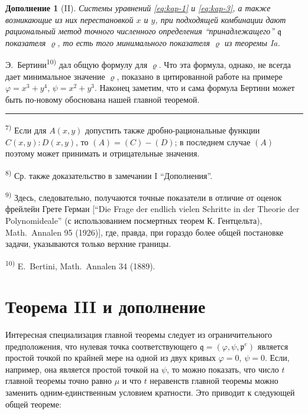 \documentclass[11pt]{article}
\newcommand{\foreign}[1]{#1}
\theoremstyle{plain}
\newtheorem{zusatz}{Дополнение}
\begin{document}
\begin{zusatz}[II]
Системы уравнений \eqref{eq:kap-1} и \eqref{eq:kap-3}, а также
возникающие из них перестановкой $x$ и $y$, при подходящей
комбинации дают рациональный метод точного численного определения
``принадлежащего'' $\mathfrak{q}$ показателя $\varrho$, то есть того
минимального показателя $\varrho$ из теоремы Ia.
\end{zusatz}

Э.\ Бертини\textsuperscript{10)} дал общую формулу для $\varrho$.
Что эта формула, однако, не всегда дает минимальное значение
$\varrho$, показано в цитированной работе на примере
$\varphi = x^{3} + y^{4}$, $\psi = x^{2} + y^{3}$. Наконец заметим,
что и сама формула Бертини может быть по-новому обоснована нашей
главной теоремой.

\vspace{0.5em}
\noindent\rule{\textwidth}{0.4pt}
\vspace{0.3em}

{\footnotesize
\textsuperscript{7)} Если для $A(x,y)$ допустить также дробно-рациональные
функции $C(x,y):D(x,y)$, то $(A) = (C) - (D)$; в последнем случае
$(A)$ поэтому может принимать и отрицательные значения.

\textsuperscript{8)} Ср. также доказательство в замечании I ``Дополнения''.

\textsuperscript{9)} Здесь, следовательно, получаются точные показатели в
отличие от оценок фрейлейн Грете Герман [``Die Frage der endlich vielen Schritte
in der Theorie der Polynomideale'' (с использованием посмертных теорем
К. Гентцельта), \foreign{Math.\ Annalen} 95 (1926)], где, правда, при
гораздо более общей постановке задачи, указываются только верхние границы.

\textsuperscript{10)} E.\ Bertini, \foreign{Math.\ Annalen} 34 (1889).
}

\newpage
\section*{Теорема III и дополнение}

Интересная специализация главной теоремы следует из ограничительного
предположения, что нулевая точка соответствующего
$\mathfrak{q} = (\varphi, \psi, \mathfrak{p}^{e})$ является
простой точкой по крайней мере на одной из двух кривых
$\varphi = 0$, $\psi = 0$. Если, например, она является простой
точкой на $\psi$, то можно показать, что число $t$ главной теоремы
точно равно $\mu$ и что $t$ неравенств главной теоремы можно
заменить одним-единственным условием кратности. Это приводит к
следующей общей теореме:
\end{document}
